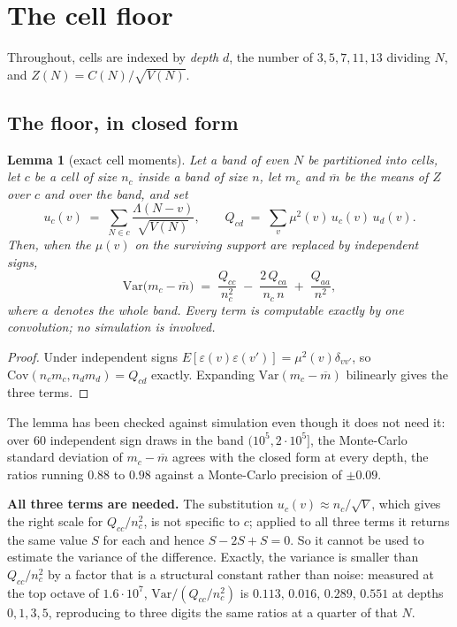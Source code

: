 \documentclass[11pt,a4paper]{article}
\theoremstyle{plain}
\newtheorem{lemma}[theorem]{Lemma}
\theoremstyle{definition}
\begin{document}
\section{The cell floor}\label{sec:floor}

Throughout, cells are indexed by \emph{depth} $d$, the number of
$3,5,7,11,13$ dividing $N$, and $Z(N)=C(N)/\sqrt{V(N)}$.

\subsection{The floor, in closed form}

\begin{lemma}[exact cell moments]\label{lem:cellmom}
Let a band of even $N$ be partitioned into cells, let $c$ be a cell of
size $n_c$ inside a band of size $n$, let $m_c$ and $\overline m$ be
the means of $Z$ over $c$ and over the band, and set
\[
  u_c(v) \;=\; \sum_{N\in c}\frac{\Lambda(N-v)}{\sqrt{V(N)}},
  \qquad
  Q_{cd} \;=\; \sum_v \mu^2(v)\,u_c(v)\,u_d(v).
\]
Then, when the $\mu(v)$ on the surviving support are replaced by
independent signs,
\[
  \mathrm{Var}\bigl(m_c-\overline m\bigr)
  \;=\; \frac{Q_{cc}}{n_c^{2}}
  \;-\; \frac{2\,Q_{ca}}{n_c\,n}
  \;+\; \frac{Q_{aa}}{n^{2}},
\]
where $a$ denotes the whole band. Every term is computable exactly by
one convolution; no simulation is involved.
\end{lemma}

\begin{proof}
Under independent signs $E[\varepsilon(v)\varepsilon(v')]
=\mu^2(v)\delta_{vv'}$, so
$\mathrm{Cov}(n_c m_c, n_d m_d) = Q_{cd}$ exactly. Expanding
$\mathrm{Var}(m_c-\overline m)$ bilinearly gives the three terms.
\end{proof}

The lemma has been checked against simulation even though it does not
need it: over $60$ independent sign draws in the band
$(10^5,2\cdot10^5]$, the Monte-Carlo standard deviation of
$m_c-\overline m$ agrees with the closed form at every depth, the
ratios running $0.88$ to $0.98$ against a Monte-Carlo precision of
$\pm0.09$.

\textbf{All three terms are needed.} The substitution
$u_c(v)\approx n_c/\sqrt V$, which gives the right scale for
$Q_{cc}/n_c^2$, is not specific to $c$; applied to all three terms it
returns the same value $S$ for each and hence $S-2S+S=0$. So it cannot
be used to estimate the variance of the difference. Exactly, the
variance is smaller than $Q_{cc}/n_c^2$ by a factor that is a
structural constant rather than noise: measured at the top octave of
$1.6\cdot10^7$, $\mathrm{Var}/(Q_{cc}/n_c^2)$ is
$0.113,\,0.016,\,0.289,\,0.551$ at depths $0,1,3,5$, reproducing to
three digits the same ratios at a quarter of that $N$.
\end{document}

